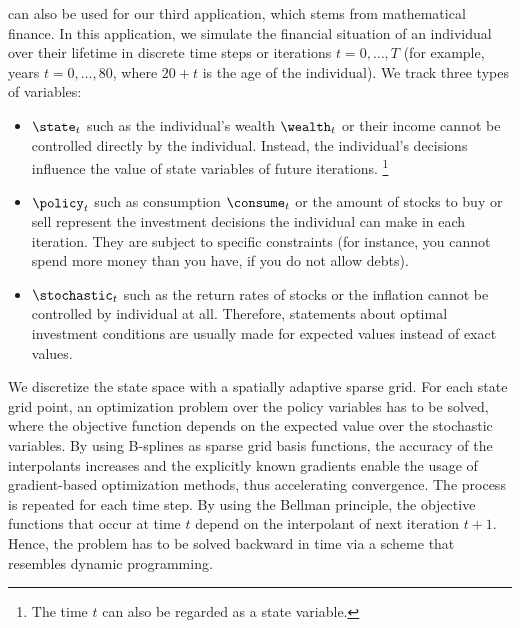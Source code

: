 
\label{chap:80finance}

can also be used for our third application,
which stems from mathematical finance.
In this application, we simulate the financial situation of an individual
over their lifetime in discrete time steps or iterations $t = 0, \dotsc, T$
(for example, years $t = 0, \dotsc, 80$, where $20+t$ is the age
of the individual).
We track three types of variables:

\begin{itemize}
  \item
   $\state_t$
  such as the individual's wealth $\wealth_t$ or their income
  cannot be controlled directly by the individual.
  Instead, the individual's decisions influence the value of
  state variables of future iterations.%
  \footnote{%
    The time $t$ can also be regarded as a state variable.%
  }
  
  \item
   $\policy_t$
  such as consumption $\consume_t$ or the amount of stocks to buy or sell
  represent the investment decisions the individual can make in
  each iteration.
  They are subject to specific constraints
  (for instance, you cannot spend more money than you have,
  if you do not allow debts).
  
  \item
   $\stochastic_t$
  such as the return rates of stocks or the inflation
  cannot be controlled by individual at all.
  Therefore, statements about optimal investment conditions
  are usually made for expected values instead of exact values.
\end{itemize}

\noindent
We discretize the state space with a spatially adaptive sparse grid.
For each state grid point, an optimization problem over the policy
variables has to be solved, where the objective function depends
on the expected value over the stochastic variables.
By using B-splines as sparse grid basis functions,
the accuracy of the interpolants increases and
the explicitly known gradients enable the usage of
gradient-based optimization methods, thus accelerating convergence.
The process is repeated for each time step.
By using the Bellman principle, the objective functions that
occur at time $t$ depend on the interpolant of next iteration $t+1$.
Hence, the problem has to be solved backward in time
via a scheme that resembles dynamic programming.

